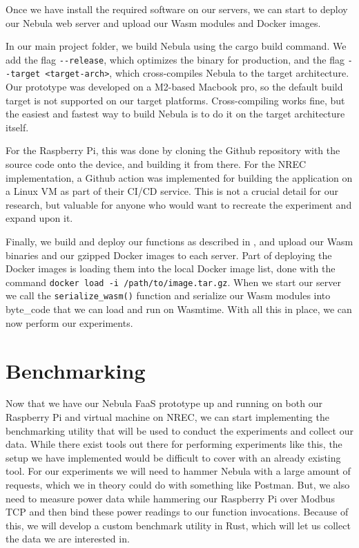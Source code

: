 \documentclass[
  table]{report}
\begin{document}
Once we have install the required software on our servers, we can start
to deploy our Nebula web server and upload our \ac{Wasm} modules and
Docker images.

In our main project folder, we build Nebula using the cargo build
command. We add the flag \texttt{-\/-release}, which optimizes the
binary for production, and the flag
\texttt{-\/-target\ \textless{}target-arch\textgreater{}}, which
cross-compiles Nebula to the target architecture. Our prototype was
developed on a M2-based Macbook pro, so the default build target is not
supported on our target platforms. Cross-compiling works fine, but the
easiest and fastest way to build Nebula is to do it on the target
architecture itself.

For the Raspberry Pi, this was done by cloning the Github repository
with the source code onto the device, and building it from there. For
the \ac{NREC} implementation, a Github action was implemented for
building the application on a Linux VM as part of their CI/CD service.
This is not a crucial detail for our research, but valuable for anyone
who would want to recreate the experiment and expand upon it.

Finally, we build and deploy our functions as described in
, and upload our \ac{Wasm} binaries and our
gzipped Docker images to each server. Part of deploying the Docker
images is loading them into the local Docker image list, done with the
command \texttt{docker\ load\ -i\ /path/to/image.tar.gz}. When we start
our server we call the \texttt{serialize\_wasm()} function and serialize
our \ac{Wasm} modules into byte\_code that we can load and run on
Wasmtime. With all this in place, we can now perform our experiments.

\section{Benchmarking}
\label{sect:impl_bench}

Now that we have our Nebula \ac{FaaS} prototype up and running on both
our Raspberry Pi and virtual machine on \ac{NREC}, we can start
implementing the benchmarking utility that will be used to conduct the
experiments and collect our data. While there exist tools out there for
performing experiments like this, the setup we have implemented would be
difficult to cover with an already existing tool. For our experiments we
will need to hammer Nebula with a large amount of requests, which we in
theory could do with something like Postman. But, we also need to
measure power data while hammering our Raspberry Pi over Modbus TCP and
then bind these power readings to our function invocations. Because of
this, we will develop a custom benchmark utility in Rust, which will let
us collect the data we are interested in.
\end{document}
